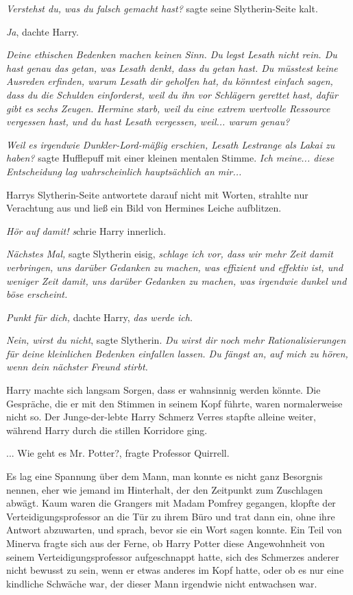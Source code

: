 \emph{Verstehst du, was du falsch gemacht hast?} sagte seine Slytherin-Seite
kalt.

\emph{Ja}, dachte Harry.

\emph{Deine ethischen Bedenken machen keinen Sinn. Du legst Lesath nicht rein. Du hast genau das getan, was Lesath denkt, dass du getan hast. Du müsstest keine Ausreden erfinden, warum Lesath dir geholfen hat, du könntest einfach sagen, dass du die Schulden einforderst, weil du ihn vor Schlägern gerettet hast, dafür gibt es sechs Zeugen. Hermine starb, weil du eine extrem wertvolle Ressource vergessen hast, und du hast Lesath vergessen, weil... warum genau? }

\emph{Weil es irgendwie Dunkler-Lord-mäßig erschien, Lesath Lestrange als Lakai
zu haben?} sagte Hufflepuff mit einer kleinen mentalen Stimme.\emph{ Ich
meine... diese Entscheidung lag wahrscheinlich hauptsächlich an mir...}

Harrys Slytherin-Seite antwortete darauf nicht mit Worten, strahlte nur
Verachtung aus und ließ ein Bild von Hermines Leiche aufblitzen.

\emph{Hör auf damit! s}chrie Harry innerlich.

\emph{Nächstes Mal,} sagte Slytherin eisig, \emph{schlage ich vor, dass wir mehr
Zeit damit verbringen, uns darüber Gedanken zu machen, was effizient und
effektiv ist, und weniger Zeit damit, uns darüber Gedanken zu machen, was
irgendwie dunkel und böse erscheint. }

\emph{Punkt für dich,} dachte Harry, \emph{das werde ich.}

\emph{Nein, wirst du nicht}, sagte Slytherin. \emph{Du wirst dir noch mehr
Rationalisierungen für deine kleinlichen Bedenken einfallen lassen. Du fängst
an, auf mich zu hören, wenn dein nächster Freund stirbt.}

Harry machte sich langsam Sorgen, dass er wahnsinnig werden könnte. Die
Gespräche, die er mit den Stimmen in seinem Kopf führte, waren normalerweise
nicht so. Der Junge-der-lebte Harry Schmerz Verres stapfte alleine weiter,
während Harry durch die stillen Korridore ging.


... \glqq Wie geht es Mr. Potter?\grqq{}, fragte Professor Quirrell.

Es lag eine Spannung über dem Mann, man konnte es nicht ganz Besorgnis nennen,
eher wie jemand im Hinterhalt, der den Zeitpunkt zum Zuschlagen abwägt. Kaum
waren die Grangers mit Madam Pomfrey gegangen, klopfte der
Verteidigungsprofessor an die Tür zu ihrem Büro und trat dann ein, ohne ihre
Antwort abzuwarten, und sprach, bevor sie ein Wort sagen konnte. Ein Teil von
Minerva fragte sich aus der Ferne, ob Harry Potter diese Angewohnheit von seinem
Verteidigungsprofessor aufgeschnappt hatte, sich des Schmerzes anderer nicht
bewusst zu sein, wenn er etwas anderes im Kopf hatte, oder ob es nur eine
kindliche Schwäche war, der dieser Mann irgendwie nicht entwachsen war.

